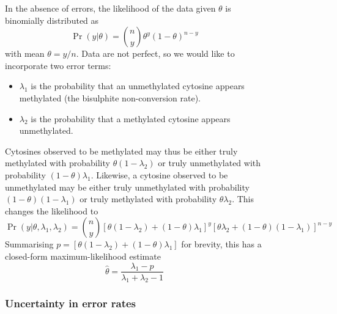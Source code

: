 \documentclass[12pt,longbibliography]{article}
\begin{document}
\begin{figure}
In the absence of errors, the likelihood of the data given $\theta$ is binomially distributed as
\begin{equation}
    \label{eqn:classic-binomial}
    \Pr(y| \theta) = {n \choose y} \theta^y(1-\theta)^{n-y}
\end{equation}
with mean $\theta=y/n$.
Data are not perfect, so we would like to incorporate two error terms:
\begin{itemize}
    \item $\lambda_1$ is the probability that an unmethylated cytosine appears methylated (the bisulphite non-conversion rate).
    \item $\lambda_2$ is the probability that a methylated cytosine appears unmethylated.
\end{itemize}
Cytosines observed to be methylated may thus be either truly methylated with probability $\theta(1-\lambda_2)$ or truly unmethylated with probability $(1-\theta)\lambda_1$. Likewise, a cytosine observed to be unmethylated may be either truly unmethylated with probability $(1-\theta)(1-\lambda_1)$ or truly methylated with probability $\theta \lambda_2$.
This changes the likelihood to
\begin{equation}
    \label{eqn:binom-with-errors}
    \Pr(y | \theta, \lambda_1, \lambda_2) = 
    {n \choose y}
    [\theta(1-\lambda_2) + (1-\theta)\lambda_1]^y
    [\theta \lambda_2 + (1-\theta)(1-\lambda_1)]^{n-y}
\end{equation}
Summarising $p=[\theta(1-\lambda_2) + (1-\theta)\lambda_1]$ for brevity, this has a closed-form maximum-likelihood estimate
\begin{equation}
    \label{eqn:ml-theta}
    \hat{\theta} = \frac{\lambda_1-p}{\lambda_1 + \lambda_2 -1}
\end{equation}

\subsubsection{Uncertainty in error rates}


\end{figure}
\end{document}
